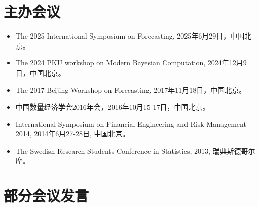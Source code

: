 \documentclass[twoside,a4paper,11pt]{article}
\begin{document}
\newpage
\section{主办会议}

\begin{itemize}

\item The 2025 International Symposium on Forecasting, 2025年6月29日，中国北京。
\item The 2024 PKU workshop on Modern Bayesian Computation, 2024年12月9日，中国北京。

\item  The 2017 Beijing Workshop on Forecasting, 2017年11月18日，中国北京。
\item 中国数量经济学会2016年会，2016年10月15-17日，中国北京。

\item International Symposium on Financial Engineering and Risk Management 2014,
  2014年6月27-28日, 中国北京。

\item The Swedish Research Students Conference in Statistics, 2013, 瑞典斯德哥尔摩。
\end{itemize}

\section{部分会议发言}

\end{document}
